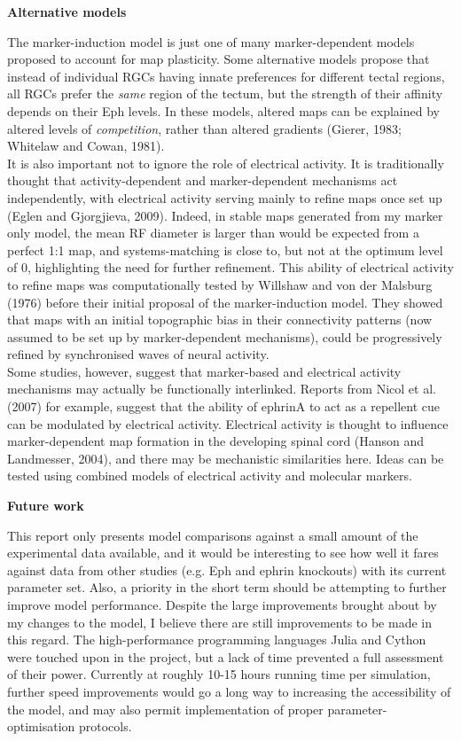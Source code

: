 \documentclass[11pt]{"article"}
\begin{document}
\textbf{Alternative models}

The marker-induction model is just one of many marker-dependent models proposed to account for map plasticity. Some alternative models propose that instead of individual RGCs having innate preferences for different tectal regions, all RGCs prefer the \textit{same} region of the tectum, but the strength of their affinity depends on their Eph levels. In these models, altered maps can be explained by altered levels of \textit{competition}, rather than altered gradients (Gierer, 1983; Whitelaw and Cowan, 1981).
\\

It is also important not to ignore the role of electrical activity. It is traditionally thought that activity-dependent and marker-dependent mechanisms act independently, with electrical activity serving mainly to refine maps once set up (Eglen and Gjorgjieva, 2009). Indeed, in stable maps generated from my marker only model, the mean RF diameter is larger than would be expected from a perfect 1:1 map, and systems-matching is close to, but not at the optimum level of 0, highlighting the need for further refinement. This ability of electrical activity to refine maps was computationally tested by Willshaw and von der Malsburg (1976) before their initial proposal of the marker-induction model. They showed that maps with an initial topographic bias in their connectivity patterns (now assumed to be set up by marker-dependent mechanisms), could be progressively refined by synchronised waves of neural activity. \\

Some studies, however, suggest that marker-based and electrical activity mechanisms may actually be functionally interlinked. Reports from Nicol et al. (2007) for example, suggest that the ability of ephrinA to act as a repellent cue can be modulated by electrical activity. Electrical activity is thought to influence marker-dependent map formation in the developing spinal cord (Hanson and Landmesser, 2004), and there may be mechanistic similarities here. Ideas can be tested using combined models of electrical activity and molecular markers. \\

\pagebreak

\textbf{Future work}

This report only presents model comparisons against a small amount of the experimental data available, and it would be interesting to see how well it fares against data from other studies (e.g. Eph and ephrin knockouts) with its current parameter set. Also, a priority in the short term should be attempting to further improve model performance. Despite the large improvements brought about by my changes to the model, I believe there are still improvements to be made in this regard. The high-performance programming languages Julia and Cython were touched upon in the project, but a lack of time prevented a full assessment of their power. Currently at roughly 10-15 hours running time per simulation, further speed improvements would go a long way to increasing the accessibility of the model, and may also permit implementation of proper parameter-optimisation protocols. \\
\end{document}
